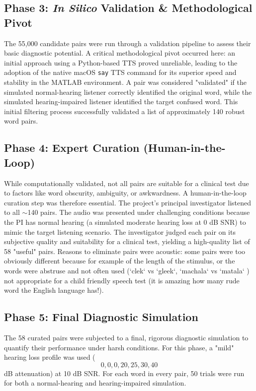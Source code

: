 \documentclass{article}
\begin{document}
\subsection{Phase 3: \textit{In Silico} Validation \& Methodological Pivot}
The 55,000 candidate pairs were run through a validation pipeline to assess their basic diagnostic potential. A critical methodological pivot occurred here: an initial approach using a Python-based TTS proved unreliable, leading to the adoption of the native macOS \texttt{say} TTS command for its superior speed and stability in the MATLAB environment. A pair was considered "validated" if the simulated normal-hearing listener correctly identified the original word, while the simulated hearing-impaired listener identified the target confused word. This initial filtering process successfully validated a list of approximately 140 robust word pairs.

\subsection{Phase 4: Expert Curation (Human-in-the-Loop)}
While computationally validated, not all pairs are suitable for a clinical test due to factors like word obscurity, ambiguity, or awkwardness. A human-in-the-loop curation step was therefore essential. The project's principal investigator listened to all $\sim$140 pairs. The audio was presented under challenging conditions because the PI has normal hearing (a simulated moderate hearing loss at 0 dB SNR) to mimic the target listening scenario. The investigator judged each pair on its subjective quality and suitability for a clinical test, yielding a high-quality list of 58 "useful" pairs. Reasons to eliminate pairs were acoustic: some pairs were too obviously different because for example of the length of the stimulus, or the words were abstruse and not often used (`clek` vs `gleek`, `machala` vs `matala` ) not appropriate for a child friendly speech test (it is amazing how many rude word the English language has!).

\subsection{Phase 5: Final Diagnostic Simulation}
The 58 curated pairs were subjected to a final, rigorous diagnostic simulation to quantify their performance under harsh conditions. For this phase, a "mild" hearing loss profile was used (\[0, 0, 0, 20, 25, 30, 40\] dB attenuation) at 10 dB SNR. For each word in every pair, 50 trials were run for both a normal-hearing and hearing-impaired simulation.
\end{document}
